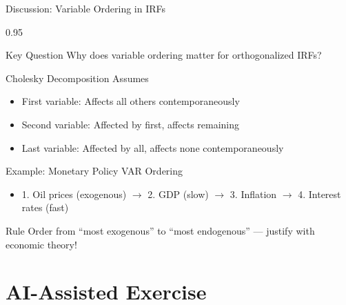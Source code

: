 \documentclass[9pt, aspectratio=169, t]{beamer}
\begin{document}
\begin{frame}{Discussion: Variable Ordering in IRFs}
    \begin{cminipage}{0.95\textwidth}
    \vspace{-0.3cm}
    {\footnotesize
    \begin{alertblock}{Key Question}
        Why does variable ordering matter for orthogonalized IRFs?
    \end{alertblock}
    \begin{block}{Cholesky Decomposition Assumes}
        \begin{itemize}\setlength{\itemsep}{0pt}
            \item First variable: Affects all others contemporaneously
            \item Second variable: Affected by first, affects remaining
            \item Last variable: Affected by all, affects none contemporaneously
        \end{itemize}
    \end{block}
    \begin{exampleblock}{Example: Monetary Policy VAR Ordering}
        \begin{itemize}\setlength{\itemsep}{0pt}
            \item 1. Oil prices (exogenous) $\to$ 2. GDP (slow) $\to$ 3. Inflation $\to$ 4. Interest rates (fast)
        \end{itemize}
    \end{exampleblock}
    \begin{block}{Rule}
        Order from ``most exogenous'' to ``most endogenous'' --- justify with economic theory!
    \end{block}
    }
    \end{cminipage}
\end{frame}

\section{AI-Assisted Exercise}
\end{document}
